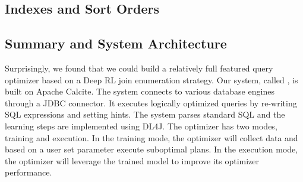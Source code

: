 \subsection{Indexes and Sort Orders}


\subsection{Summary and System Architecture}
Surprisingly, we found that we could build a relatively full featured query optimizer based on a Deep RL join enumeration strategy.
Our system, called \qsys, is built on Apache Calcite.
The system connects to various database engines through a JDBC connector. It executes logically optimized queries by re-writing SQL expressions and setting hints.
The system parses standard SQL and the learning steps are implemented using \textsf{DL4J}.
The optimizer has two modes, training and execution. In the training mode, the optimizer will collect data and based on a user set parameter execute suboptimal plans. In the execution mode, the optimizer will leverage the trained model to improve its optimizer performance.

